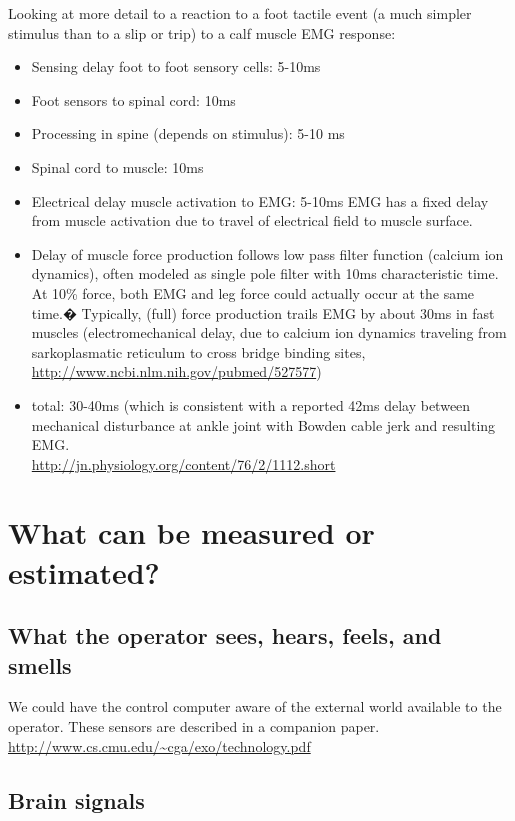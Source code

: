 \documentclass[letterpaper,12pt,fullpage]{article}
\begin{document}
Looking at more detail to a reaction to a foot tactile event (a much
simpler stimulus than to a slip or trip)
to a calf muscle EMG response:
\begin{itemize}
\item
Sensing delay foot to foot sensory cells: 5-10ms
\item
Foot sensors to spinal cord: 10ms 
\item
Processing in spine (depends on stimulus): 5-10 ms
\item
Spinal cord to muscle: 10ms 
\item
Electrical delay muscle activation to EMG: 5-10ms
EMG has a fixed delay from muscle activation due to
travel of electrical field to muscle surface.
\item
Delay
of muscle force production follows low pass filter function (calcium
ion dynamics), often modeled as single pole filter with 10ms
characteristic time. At 10\% force, both EMG and leg force could
actually occur at the same time.�
Typically, (full) force production trails EMG by about 30ms in fast
muscles (electromechanical delay, due to calcium ion dynamics
traveling from sarkoplasmatic reticulum to cross bridge binding
sites,\\
\url{http://www.ncbi.nlm.nih.gov/pubmed/527577})
\item
total: 30-40ms (which is consistent with a reported 42ms delay
between mechanical disturbance at ankle joint with Bowden cable jerk
and resulting EMG.\\
\url{http://jn.physiology.org/content/76/2/1112.short}
\end{itemize}

\section{What can be measured or estimated?}

\subsection{What the operator sees, hears, feels, and smells}

We could have the control computer aware of the external world
available to the operator. These sensors are described in
a companion paper.\\
\url{http://www.cs.cmu.edu/~cga/exo/technology.pdf}

\subsection{Brain signals}
\end{document}
